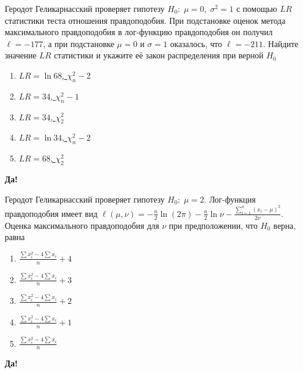 \documentclass[t]{beamer}
\begin{document}
 \begin{frame} \label{50-Yes} 
\begin{block}{50} 

Геродот Геликарнасский проверяет гипотезу $H_0: \; \mu=0, \; \sigma^2=1$ с помощью $LR$ статистики теста отношения правдоподобия. При подстановке оценок метода максимального правдоподобия в лог-функцию правдоподобия он получил $\ell=-177$, а при подстановке $\mu=0$ и $\sigma=1$ оказалось, что $\ell=-211$. Найдите значение $LR$ статистики и укажите её закон распределения при верной $H_0$
 


 \end{block} 
\begin{enumerate} 
\item[] \hyperlink{50-No}{\beamergotobutton{} $LR=\ln 68$, $\chi^2_n-2$}
\item[] \hyperlink{50-No}{\beamergotobutton{} $LR=34$, $\chi^2_n-1$}
\item[] \hyperlink{50-No}{\beamergotobutton{} $LR=34$, $\chi^2_2$}
\item[] \hyperlink{50-No}{\beamergotobutton{} $LR=\ln 34$, $\chi^2_n-2$}
\item[] \hyperlink{50-Yes}{\beamergotobutton{} $LR=68$, $\chi^2_2$}
\end{enumerate} 

 \textbf{Да!} 
 \hyperlink{51}{}\end{frame} 


 \begin{frame} \label{51-Yes} 
\begin{block}{51} 

Геродот Геликарнасский проверяет гипотезу $H_0: \; \mu=2$. Лог-функция правдоподобия имеет вид $\ell(\mu,\nu)=-\frac{n}{2}\ln (2\pi)-\frac{n}{2}\ln \nu -\frac{\sum_{i=1}^n(x_i-\mu)^2}{2\nu}$. Оценка максимального правдоподобия для $\nu$ при предположении, что $H_0$ верна, равна
 


 \end{block} 
\begin{enumerate} 
\item[] \hyperlink{51-Yes}{\beamergotobutton{}$\frac{\sum x_i^2 - 4\sum x_i}{n}+4$}
\item[] \hyperlink{51-No}{\beamergotobutton{} $\frac{\sum x_i^2 - 4\sum x_i}{n}+3$}
\item[] \hyperlink{51-No}{\beamergotobutton{} $\frac{\sum x_i^2 - 4\sum x_i}{n}+2$}
\item[] \hyperlink{51-No}{\beamergotobutton{} $\frac{\sum x_i^2 - 4\sum x_i}{n}+1$}
\item[] \hyperlink{51-No}{\beamergotobutton{} $\frac{\sum x_i^2 - 4\sum x_i}{n}$}
\end{enumerate} 

 \textbf{Да!} 
 \hyperlink{52}{}\end{frame} 
\end{document}
